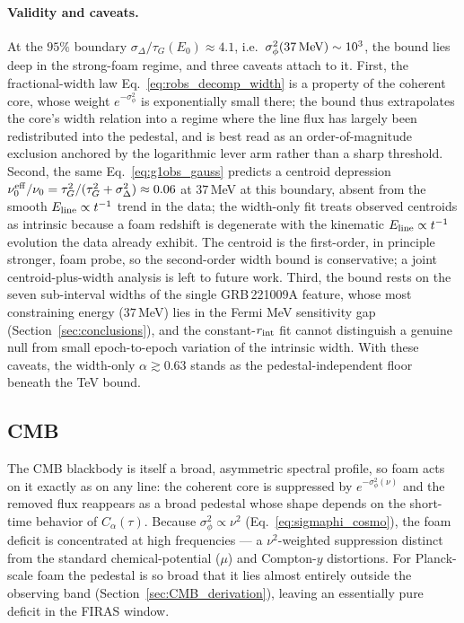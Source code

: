 \documentclass[aps,prd,onecolumn,amsmath,amssymb]{revtex4-2}
\begin{document}
\paragraph{Validity and caveats.}
At the $95\%$ boundary $\sigma_\Delta/\tau_G(E_0)\approx4.1$, i.e.\
$\sigma_\phi^2(37\,{\rm MeV})\sim10^3$, the bound lies deep in the
strong-foam regime, and three caveats attach to it.  First, the
fractional-width law Eq.~\eqref{eq:robs_decomp_width} is a property of the
coherent core, whose weight $e^{-\sigma_\phi^2}$ is exponentially small
there; the bound thus extrapolates the core's width relation into a regime
where the line flux has largely been redistributed into the pedestal, and
is best read as an order-of-magnitude exclusion anchored by the logarithmic
lever arm rather than a sharp threshold.  Second, the same
Eq.~\eqref{eq:g1obs_gauss} predicts a centroid depression
$\nu_0^{\rm eff}/\nu_0=\tau_G^2/(\tau_G^2+\sigma_\Delta^2)\approx0.06$ at
$37$\,MeV at this boundary, absent from the smooth
$E_{\rm line}\propto t^{-1}$ trend in the data; the width-only fit treats
observed centroids as intrinsic because a foam redshift is degenerate with
the kinematic $E_{\rm line}\propto t^{-1}$ evolution the data already
exhibit.  The centroid is the first-order, in principle stronger, foam
probe, so the second-order width bound is conservative; a joint
centroid-plus-width analysis is left to future work.  Third, the bound rests on the seven sub-interval
widths of the single GRB\,221009A feature, whose most constraining energy
($37$\,MeV) lies in the Fermi MeV sensitivity gap
(Section~\ref{sec:conclusions}), and the constant-$r_{\rm int}$ fit cannot
distinguish a genuine null from small epoch-to-epoch variation of the
intrinsic width.  With these caveats, the width-only $\alpha\gtrsim0.63$
stands as the pedestal-independent floor beneath the TeV bound.

\subsection{CMB}
\label{sec:CMB}

The CMB blackbody is itself a broad, asymmetric spectral profile, so foam
acts on it exactly as on any line: the coherent core is suppressed by
$e^{-\sigma_\phi^2(\nu)}$ and the removed flux reappears as a broad
pedestal whose shape depends on the short-time behavior of
$C_\alpha(\tau)$.  Because
$\sigma_\phi^2\propto\nu^2$ (Eq.~\eqref{eq:sigmaphi_cosmo}), the foam deficit
is concentrated at high frequencies --- a $\nu^2$-weighted suppression
distinct from the standard chemical-potential ($\mu$) and Compton-$y$
distortions.  For Planck-scale foam the pedestal is so broad that it lies
almost entirely outside the observing band (Section~\ref{sec:CMB_derivation}),
leaving an essentially pure deficit in the FIRAS window.
\end{document}
